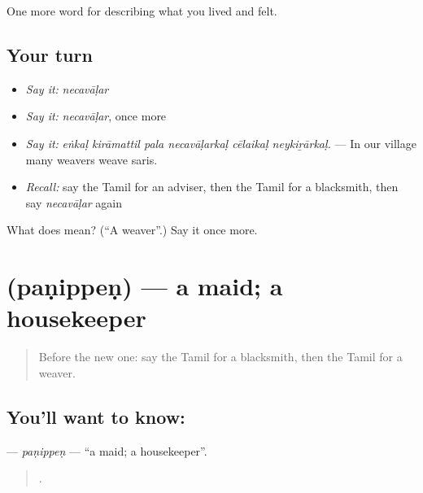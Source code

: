 \begin{grammarlens}[title={What you've built}]
One more word for describing what you lived and felt.
\end{grammarlens}

\subsection*{Your turn}
\begin{itemize}
\raggedright
  \item \emph{Say it:} \emph{necavāḷar}
  \item \emph{Say it:} \emph{necavāḷar}, once more
  \item \emph{Say it:} \emph{eṅkaḷ kirāmattil pala necavāḷarkaḷ cēlaikaḷ neykiṟārkaḷ.} — In our village many weavers weave saris.
  \item \emph{Recall:} say the Tamil for an adviser, then the Tamil for a blacksmith, then say \emph{necavāḷar} again
\end{itemize}

\begin{tcolorbox}[breakable,colback=teal!4,colframe=teal!35!black,title={Before you move on}]
What does  mean? (\textquotedblleft{}A weaver\textquotedblright{}.) Say it once more.
\end{tcolorbox}
\section[\texorpdfstring{\ta{பணிப்பெண்} (paṇippeṇ)}{பணிப்பெண் (paṇippeṇ)}]{ (paṇippeṇ) — a maid; a housekeeper}

\label{lesson:TA-C513-panippen}



\begin{quote}
Before the new one: say the Tamil for a blacksmith, then the Tamil for a weaver.
\end{quote}

\subsection*{You'll want to know: }
\textbf{} — \emph{paṇippeṇ} — \textquotedblleft{}a maid; a housekeeper\textquotedblright{}.

\begin{quote}
     .
\end{quote}

